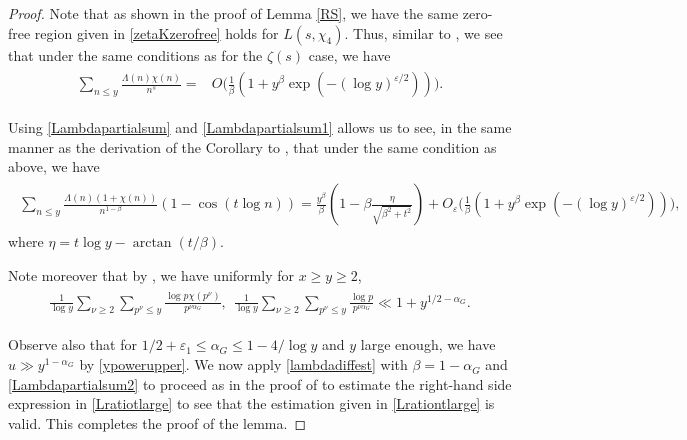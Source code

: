 \documentclass[twoside,leqno,10pt, A4]{amsart}
\begin{document}
\begin{proof}
  Note that as shown in the proof of Lemma \ref{RS}, we have the same zero-free region given in \eqref{zetaKzerofree} holds for $L(s, \chi_4)$. Thus, similar to \cite[Lemma 6]{HT86}, we see that under the same conditions as for the $\zeta(s)$ case, we have
\begin{align}
\label{Lambdapartialsum1}
\begin{split}
  \sum_{n \leq y}\frac {\Lambda(n)\chi(n)}{n^s}
=& O\Big(\frac 1{\beta}(1+y^{\beta}\exp(-(\log y)^{\varepsilon/2}))\Big ).
\end{split}
\end{align}    

  Using \eqref{Lambdapartialsum} and \eqref{Lambdapartialsum1} allows us to see, in the same manner as the derivation of the Corollary to \cite[Lemma 6]{HT86}, that under the same condition as above, we have  
\begin{align}
\label{lambdadiffest}
\begin{split}
   \sum_{n \leq y}\frac {\Lambda(n)(1+\chi(n))}{n^{1-\beta}}(1-\cos(t\log n))=\frac {y^{\beta}}{\beta}(1-\beta\frac {\eta}{\sqrt{\beta^2+t^2}})+O_{\varepsilon}\Big(\frac 1{\beta}(1+y^{\beta}\exp(-(\log y)^{\varepsilon/2}))\Big),
\end{split}
\end{align}  
  where $\eta=t\log y -\arctan(t/\beta)$. 
  
  
  Note moreover that by \cite[Lemma 5]{HT86}, we have uniformly for $x \geq y \geq 2$, 
\begin{align}
\label{Lambdapartialsum2}
\begin{split}
  \frac 1{\log y}\sum_{\nu \geq 2}\sum_{p^{\nu} \leq y}\frac {\log p\chi(p^{\nu})}{p^{\nu \alpha_G}}, \ \  \frac 1{\log y}\sum_{\nu \geq 2}\sum_{p^{\nu} \leq y}\frac {\log p}{p^{\nu \alpha_G}} \ll 1+y^{1/2-\alpha_G}. 
\end{split}
\end{align}   

 Observe also that for $1/2+\varepsilon_1 \leq \alpha_G \leq 1-4/\log y$ and $y$ large enough, we have $u \gg y^{1-\alpha_G}$ by \eqref{ypowerupper}. 
We now apply \eqref{lambdadiffest} with $\beta=1-\alpha_G$ and \eqref{Lambdapartialsum2} to proceed as in the proof of \cite[Lemma 8, (ii)]{HT86} 
to estimate the right-hand side expression in \eqref{Lratiotlarge} to see that the estimation given in \eqref{Lrationtlarge} is valid. This completes the proof of the lemma. 
\end{proof}
\end{document}
